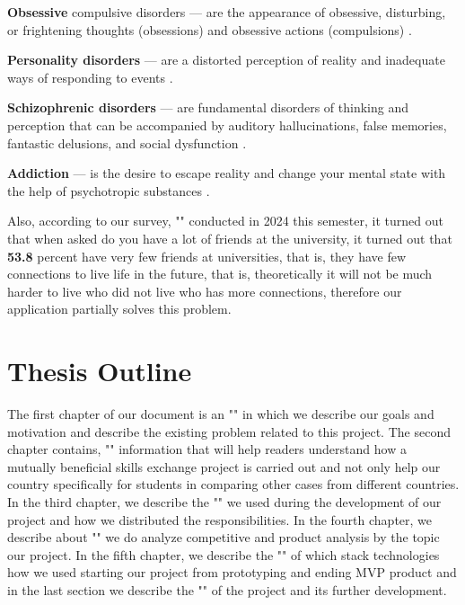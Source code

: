 \par
\vspace{0.5cm}
\textbf{Obsessive} compulsive disorders — are the appearance of obsessive, disturbing, or frightening thoughts (obsessions) and obsessive actions (compulsions) \cite{student-fears}.

\par
\vspace{0.5cm}
\textbf{Personality disorders}  —  are a distorted perception of reality and inadequate ways of responding to events \cite{student-fears}.

\par
\vspace{0.5cm}
\textbf{Schizophrenic disorders} — are fundamental disorders of thinking and perception that can be accompanied by auditory hallucinations, false memories, fantastic delusions, and social dysfunction \cite{student-fears}.

\par
\vspace{0.5cm}
\textbf{Addiction} — is the desire to escape reality and change your mental state with the help of psychotropic substances \cite{student-fears}.

\vspace{0.5cm}
Also, according to our survey, "" conducted in 2024 this semester, it turned out that when asked do you have a lot of friends at the university, it turned out that \textbf{53.8} percent have very few friends at universities, that is, they have few connections to live life in the future, that is, theoretically it will not be much harder to live who did not live who has more connections, therefore our application partially solves this problem.

\newpage
\section{Thesis Outline}\label{thesis}
 The first chapter of our document is an "" in which we describe our goals and motivation and describe the existing problem related to this project. The second chapter contains, "" information that will help readers understand how a mutually beneficial skills exchange project is carried out and not only help our country specifically for students in comparing other cases from different countries. In the third chapter, we describe the "" we used during the development of our project and how we distributed the responsibilities. In the fourth chapter, we describe about "" we do analyze competitive and product analysis by the topic our project. In the fifth chapter, we describe the "" of which stack technologies how we used starting our project from prototyping and ending MVP product and in the last section we describe the "" of the project and its further development.
